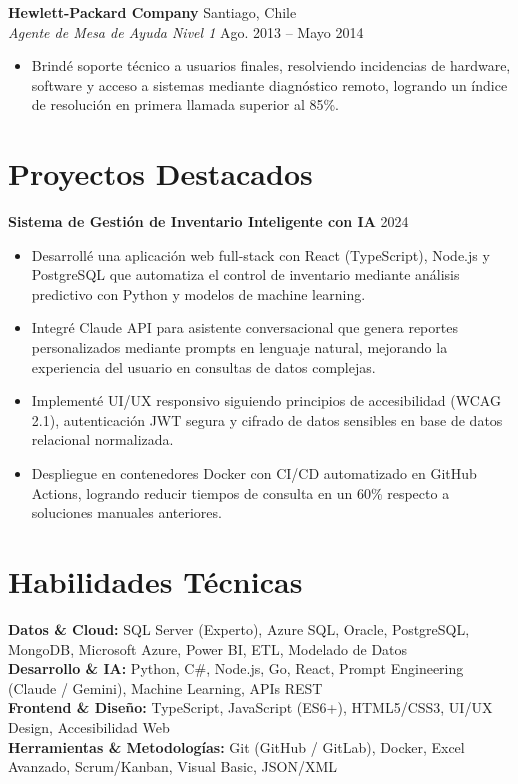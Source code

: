 \documentclass[11pt,letterpaper]{article}
\begin{document}
\vspace{2pt}
\textbf{Hewlett-Packard Company} \hfill Santiago, Chile\\
\textit{Agente de Mesa de Ayuda Nivel 1} \hfill Ago. 2013 – Mayo 2014
\begin{itemize}
  \item Brindé soporte técnico a usuarios finales, resolviendo incidencias de hardware, software y acceso a sistemas mediante diagnóstico remoto, logrando un índice de resolución en primera llamada superior al 85\%.
\end{itemize}

\section{Proyectos Destacados}

\textbf{Sistema de Gestión de Inventario Inteligente con IA} \hfill 2024
\begin{itemize}
  \item Desarrollé una aplicación web full-stack con React (TypeScript), Node.js y PostgreSQL que automatiza el control de inventario mediante análisis predictivo con Python y modelos de machine learning.
  \item Integré Claude API para asistente conversacional que genera reportes personalizados mediante prompts en lenguaje natural, mejorando la experiencia del usuario en consultas de datos complejas.
  \item Implementé UI/UX responsivo siguiendo principios de accesibilidad (WCAG 2.1), autenticación JWT segura y cifrado de datos sensibles en base de datos relacional normalizada.
  \item Despliegue en contenedores Docker con CI/CD automatizado en GitHub Actions, logrando reducir tiempos de consulta en un 60\% respecto a soluciones manuales anteriores.
\end{itemize}

\section{Habilidades T\'{e}cnicas}
\textbf{Datos \& Cloud:} SQL Server (Experto), Azure SQL, Oracle, PostgreSQL, MongoDB, Microsoft Azure, Power BI, ETL, Modelado de Datos \\
\textbf{Desarrollo \& IA:} Python, C\#, Node.js, Go, React, Prompt Engineering (Claude / Gemini), Machine Learning, APIs REST \\
\textbf{Frontend \& Diseño:} TypeScript, JavaScript (ES6+), HTML5/CSS3, UI/UX Design, Accesibilidad Web \\
\textbf{Herramientas \& Metodologías:} Git (GitHub / GitLab), Docker, Excel Avanzado, Scrum/Kanban, Visual Basic, JSON/XML
\end{document}
